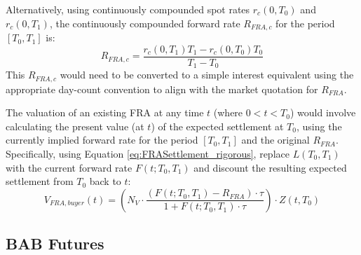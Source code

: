 \documentclass[11pt, a4paper, british]{article}
\begin{document}
Alternatively, using continuously compounded spot rates $r_c(0, T_0)$ and $r_c(0, T_1)$, the continuously compounded forward rate $R_{FRA,c}$ for the period $[T_0, T_1]$ is:
\begin{equation}
 R_{FRA,c} = \frac{r_c(0, T_1)T_1 - r_c(0, T_0)T_0}{T_1 - T_0}
 \label{eq:fra_rate_continuous_rigorous}
\end{equation}
This $R_{FRA,c}$ would need to be converted to a simple interest equivalent using the appropriate day-count convention to align with the market quotation for $R_{FRA}$.

The valuation of an existing FRA at any time $t$ (where $0 < t < T_0$) would involve calculating the present value (at $t$) of the expected settlement at $T_0$, using the currently implied forward rate for the period $[T_0, T_1]$ and the original $R_{FRA}$. Specifically, using Equation \ref{eq:FRASettlement_rigorous}, replace $L(T_0,T_1)$ with the current forward rate $F(t; T_0, T_1)$ and discount the resulting expected settlement from $T_0$ back to $t$:
\begin{equation}
 V_{FRA, buyer}(t) = \left( N_V \cdot \frac{(F(t; T_0, T_1) - R_{FRA}) \cdot \tau}{1 + F(t; T_0, T_1) \cdot \tau} \right) \cdot Z(t, T_0)
 \label{eq:fra_valuation_t_rigorous}
\end{equation}

\newpage

\subsection{BAB Futures}
\end{document}
